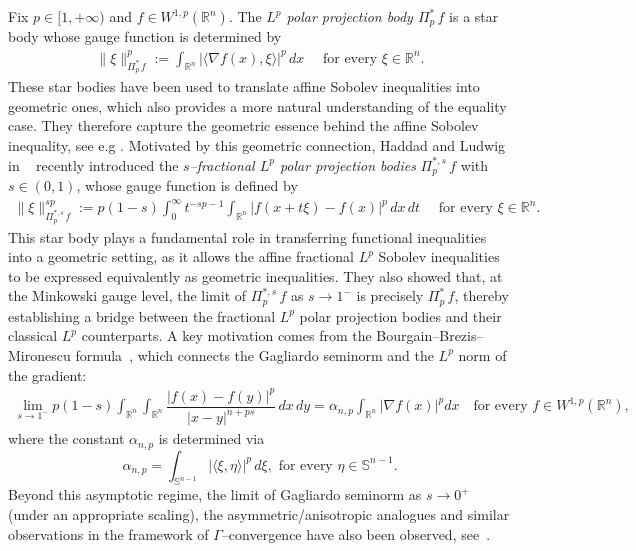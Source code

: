 \documentclass[11pt, reqno]{article}
\theoremstyle{definition}
\numberwithin{equation}{section}
\newcommand{\R}{\mathbb{R}}
\newcommand{\Sphere}{\mathbb{S}^{n - 1}}
\begin{document}
Fix $p \in [1, + \infty)$ and $f \in W^{1, p}(\R^n)$.
The \textit{$L^p$ polar projection body $\Pi^\ast_p \, f$} is a star body whose gauge function is determined by
	\begin{align*}
		\| \xi \|_{\Pi^\ast_p \, f}^p := \int_{\R^n} |\langle \nabla f(x), \xi \rangle|^p \, dx \quad \text{ for every } \xi \in \R^n.
	\end{align*}
These star bodies have been used to translate affine Sobolev inequalities into geometric ones, which also provides a more natural understanding of the equality case.
They therefore capture the geometric essence behind the affine Sobolev inequality, see e.g \cite{HS_2009, LYZ_2002, Talenti_1976, Zhang_1999}.
Motivated by this geometric connection, Haddad and Ludwig in ~\cite{HL_2024,HL_2025} recently introduced the \textit{$s$--fractional $L^p$ polar projection bodies} $\Pi^{\ast, s}_p \, f$ with $s \in (0, 1)$, whose gauge function is defined by
\begin{align*}
    \| \xi \|^{sp}_{\Pi^{\ast, s}_p \, f} := p(1 - s) \int_0^\infty t^{-sp - 1} \int_{\R^n} |f(x + t\xi) - f(x)|^p \, dx \, dt \quad \text{ for every } \xi \in \R^n.
\end{align*}
This star body plays a fundamental role in transferring functional inequalities into a geometric setting, as it allows the affine fractional $L^p$ Sobolev inequalities to be expressed equivalently as geometric inequalities.
They also showed that, at the Minkowski gauge level, the limit of $\Pi^{\ast, s}_p \, f$ as $s \to 1^-$ is precisely $\Pi^\ast_p \, f$, thereby establishing a bridge between the fractional $L^p$ polar projection bodies and their classical $L^p$ counterparts.
A key motivation comes from the Bourgain--Brezis--Mironescu formula~\cite{BBM_2001}, which connects the Gagliardo seminorm and the $L^p$ norm of the gradient:
	\begin{align*}
		\lim_{s \to 1^-} p(1 - s) \int_{\R^n} \int_{\R^n} \dfrac{|f(x) - f(y)|^p}{|x - y|^{n + ps}} \, dx \, dy = \alpha_{n, p} \int_{\R^n} | \nabla f(x) |^p dx \quad \text{for every $f \in W^{1, p}(\R^n)$,}
	\end{align*}
where the constant $\alpha_{n, p}$ is determined via
	\[
		\alpha_{n, p} = \int_{\Sphere} | \langle \xi, \eta \rangle |^p \, d\xi, \text{ for every } \eta \in \Sphere.
	\]
Beyond this asymptotic regime, the limit of Gagliardo seminorm as $s \to 0^+$ (under an appropriate scaling), the asymmetric/anisotropic analogues and similar observations in the framework of $\Gamma$--convergence have also been observed, see~\cite{ADM_2011, CLKNP_2023, L_2014, M_2014, MS_2002}.
\end{document}

